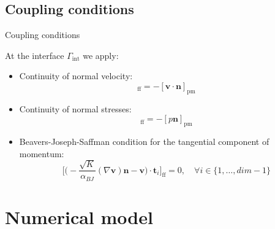 \documentclass{beamer}
\begin{document}
\subsection*{Coupling conditions}
\begin{frame}{Coupling conditions}
At the interface $\Gamma_\text{int}$ we apply:
\begin{itemize}
	\item Continuity of normal velocity:
	\begin{equation*}
	[\mathbf{v} \cdot \mathbf{n}]_\text{ff} = - [\mathbf{v} 
	\cdot \mathbf{n}]_\text{pm}
	\end{equation*}
	\item Continuity of normal stresses:
	\begin{equation*}
	[(\varrho \mathbf{v} \mathbf{v}^\mathrm{T} - (\mu + \mu_t) \nabla 
	\mathbf{v} + p\mathbbm{1}) 
	\mathbf{n}]_\text{ff} = 
	- [p\mathbf{n}]_\text{pm}
	\end{equation*}
	\item Beavers-Joseph-Saffman condition for the tangential component of 
	momentum:
	\begin{equation*}
	\bigg[ \bigg( -\frac{\sqrt{K}}{\alpha_{BJ}} (\nabla \mathbf{v}) 
	\mathbf{n} - \mathbf{v} \bigg) \cdot \mathbf{t}_i \bigg]_\text{ff} = 0, 
	\quad \forall i \in \{1, \dots, dim - 1\}
	\end{equation*}
\end{itemize}
\end{frame}
\section{Numerical model}
\end{document}
